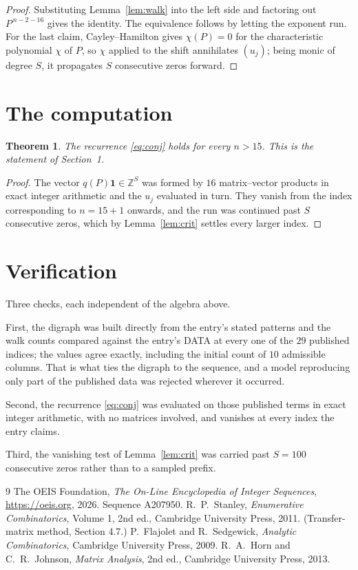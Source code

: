 \documentclass[11pt,a4paper]{article}
\theoremstyle{plain}
\newtheorem{theorem}{Theorem}
\theoremstyle{definition}
\begin{document}
\begin{proof}
Substituting Lemma~\ref{lem:walk} into the left side and factoring out
$P^{\,n-2-16}$ gives the identity. The equivalence follows by letting the exponent
run. For the last claim, Cayley--Hamilton gives $\chi(P)=0$ for the characteristic
polynomial $\chi$ of $P$, so $\chi$ applied to the shift annihilates $(u_j)$; being monic of
degree $S$, it propagates $S$ consecutive zeros forward.
\end{proof}

\section{The computation}

\begin{theorem}
The recurrence \eqref{eq:conj} holds for every $n>15$. This is the statement of
Section~1.
\end{theorem}

\begin{proof}
The vector $q(P)\mathbf{1}\in\mathbb{Z}^{S}$ was formed by $16$ matrix--vector
products in exact integer arithmetic and the $u_j$ evaluated in turn. They vanish from the
index corresponding to $n=15+1$ onwards, and the run was continued past $S$ consecutive
zeros, which by Lemma~\ref{lem:crit} settles every larger index.
\end{proof}

\section{Verification}

Three checks, each independent of the algebra above.

First, the digraph was built directly from the entry's stated patterns and the walk counts
compared against the entry's DATA at every one of the $29$ published indices; the
values agree exactly, including the initial count of $10$ admissible columns. That is
what ties the digraph to the sequence, and a model reproducing only part of the published
data was rejected wherever it occurred.

Second, the recurrence \eqref{eq:conj} was evaluated on those published terms in exact
integer arithmetic, with no matrices involved, and vanishes at every index the entry claims.

Third, the vanishing test of Lemma~\ref{lem:crit} was carried past $S=100$ consecutive
zeros rather than to a sampled prefix.

\begin{thebibliography}{9}
 The OEIS Foundation, \emph{The On-Line Encyclopedia of Integer
Sequences}, \url{https://oeis.org}, 2026. Sequence A207950.
 R.~P.~Stanley, \emph{Enumerative Combinatorics}, Volume 1, 2nd ed.,
Cambridge University Press, 2011. (Transfer-matrix method, Section 4.7.)
 P.~Flajolet and R.~Sedgewick, \emph{Analytic Combinatorics}, Cambridge
University Press, 2009.
 R.~A.~Horn and C.~R.~Johnson, \emph{Matrix Analysis}, 2nd ed., Cambridge
University Press, 2013.
\end{thebibliography}
\end{document}
